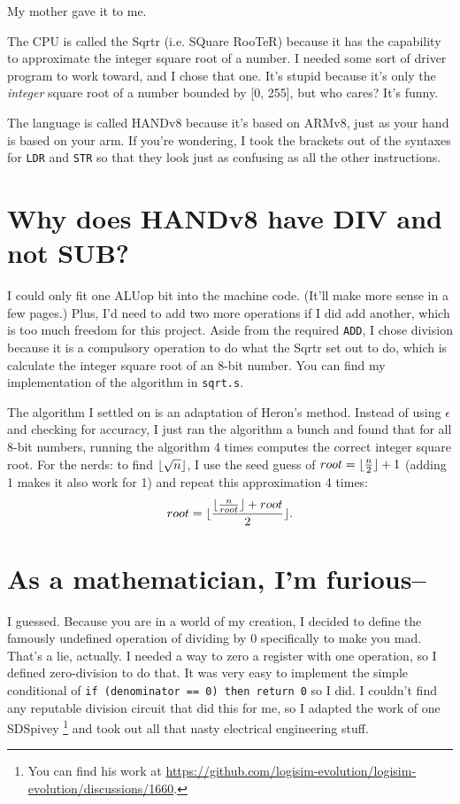 \documentclass[12pt, oneside]{memoir}
\DeclarePairedDelimiter{\floor}{\lfloor}{\rfloor}
\newcommand{\instruction}[1]{{\color{instruction}\texttt{#1}}}
\begin{document}
My mother gave it to me.

The CPU is called the Sqrtr (i.e. SQuare RooTeR) because it has the capability to approximate the integer square root of a number. I needed some sort of driver program to work toward, and I chose that one. It's stupid because it's only the \emph{integer} square root of a number bounded by [0, 255], but who cares? It's funny.

The language is called HANDv8 because it's based on ARMv8, just as your hand is based on your arm. If you're wondering, I took the brackets out of the syntaxes for \instruction{LDR} and \instruction{STR} so that they look just as confusing as all the other instructions.

\section{Why does HANDv8 have DIV and not SUB?}
I could only fit one ALUop bit into the machine code. (It'll make more sense in a few pages.) Plus, I'd need to add two more operations if I did add another, which is too much freedom for this project. Aside from the required \instruction{ADD}, I chose division because it is a compulsory operation to do what the Sqrtr set out to do, which is calculate the integer square root of an 8-bit number. You can find my implementation of the algorithm in \texttt{sqrt.s}.

The algorithm I settled on is an adaptation of Heron's method. Instead of using $\epsilon$ and checking for accuracy, I just ran the algorithm a bunch and found that for all 8-bit numbers, running the algorithm 4 times computes the correct integer square root. For the nerds: to find $\floor{\sqrt{n}}$, I use the seed guess of $root = \floor{\frac{n}{2}} + 1$ (adding 1 makes it also work for 1) and repeat this approximation 4 times:
\begin{equation*}
    root = \floor{\frac{\floor{\frac{n}{root}} + root}{2}}.
\end{equation*}

\section{As a mathematician, I'm furious--}
I guessed. Because you are in a world of my creation, I decided to define the famously undefined operation of dividing by 0 specifically to make you mad. That's a lie, actually. I needed a way to zero a register with one operation, so I defined zero-division to do that. It was very easy to implement the simple conditional of \texttt{if (denominator == 0) then return 0} so I did. I couldn't find any reputable division circuit that did this for me, so I adapted the work of one SDSpivey
\footnote{You can find his work at \href{https://github.com/logisim-evolution/logisim-evolution/discussions/1660}{https://github.com/logisim-evolution/logisim-evolution/discussions/1660}.} 
and took out all that nasty electrical engineering stuff.
\end{document}
